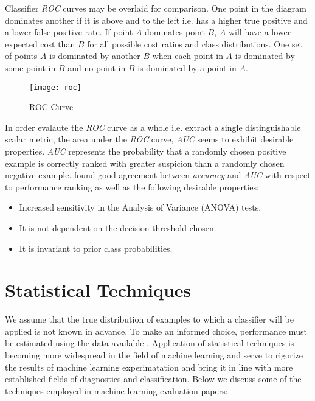 \documentclass[10pt]{unbthesis}
\begin{document}
Classifier \textit{ROC} curves may be overlaid for comparison. One
point in the diagram dominates another if it is above and to the left
i.e. has a higher true positive and a lower false positive rate. If
point \(A\) dominates point \(B\), \(A\) will have a lower expected
cost than \(B\) for all possible cost ratios and class
distributions. One set of points \(A\) is dominated by another \(B\)
when each point in \(A\) is dominated by some point in \(B\) and no
point in \(B\) is dominated by a point in \(A\).

\begin{figure}
  \begin{center}
	\texttt{[image: roc]}
  \end{center}
  \caption{ROC Curve}
  \label{fig:roc}
\end{figure} 




In order evalaute the \textit{ROC} curve as a whole i.e. extract a
single distinguishable scalar metric, the area under the \textit{ROC}
curve, \textit{AUC} seems to exhibit desirable
properties. \textit{AUC} represents the probability that a randomly
chosen positive example is correctly ranked with greater suspicion
than a randomly chosen negative example. \cite{Refworks:32} found good
agreement between \textit{accuracy} and \textit{AUC} with respect to
performance ranking as well as the following desirable properties:

\begin{itemize}
\item Increased sensitivity in the Analysis of Variance (ANOVA) tests.
\item It is not dependent on the decision threshold chosen.
\item It is invariant to prior class probabilities.
\end{itemize}

\section*{Statistical Techniques}
We assume that the true distribution of examples to which a classifier
will be applied is not known in advance. To make an informed choice,
performance must be estimated using the data available
\cite{RefWorks:45}. Application of statistical techniques is
becoming more widespread in the field of machine learning and serve to
rigorize the results of machine learning experimatation and bring it
in line with more established fields of diagnostics and
classification. Below we discuss some of the techniques employed in
machine learning evaluation papers:
\end{document}
